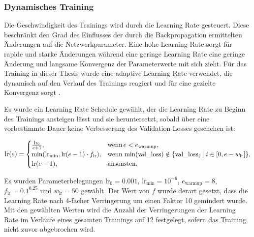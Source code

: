 \subsubsection{Dynamisches Training}
\label{sec:dynamisches_training}

Die Geschwindigkeit des Trainings wird durch die Learning Rate gesteuert. Diese beschränkt den Grad des Einflusses der durch die Backpropagation ermittelten Änderungen auf die Netzwerkparameter. Eine hohe Learning Rate sorgt für rapide und starke Änderungen während eine geringe Learning Rate eine geringe Änderung und langsame Konvergenz der Parameterwerte mit sich zieht. Für das Training in dieser Thesis wurde eine adaptive Learning Rate verwendet, die dynamisch auf den Verlauf des Trainings reagiert und für eine gezielte Konvergenz sorgt \cite{adaptive_lr_schedule}.

Es wurde ein Learning Rate Schedule gewählt, der die Learning Rate zu Beginn des Trainings ansteigen lässt und sie heruntersetzt, sobald über eine vorbestimmte Dauer keine Verbesserung des Validation-Losses geschehen ist:

\begin{equation*}
    \text{lr}(e) =
    \begin{cases}
        \frac{\text{lr}_0}{e+1},                            & \text{wenn\,} e < e_\text{warmup},                                                     \\
        \min(\text{lr}_\text{min}, \text{lr}(e-1) \cdot f_\text{lr}), & \text{wenn\,} \min(\text{val\_loss}) \notin \{\text{val\_loss}_i \mid i \in [0,e-w_\text{lr}]\}, \\
        \text{lr}(e-1),                                     & \text{ansonsten.}
    \end{cases}
\end{equation*}

Es wurden Parameterbelegungen $\text{lr}_0 = 0.001$, $\text{lr}_\text{min} = 10^{-6}$, $e_\text{warmup} = 8$, $f_\text{lr} = 0.1^{0.25}$ und $w_\text{lr} = 50$ gewählt. Der Wert von $f$ wurde derart gesetzt, dass die Learning Rate nach 4-facher Verringerung um einen Faktor 10 gemindert wurde. Mit den gewählten Werten wird die Anzahl der Verringerungen der Learning Rate im Verlaufe eines gesamten Trainings auf 12 festgelegt, sofern das Training nicht zuvor abgebrochen wird.

